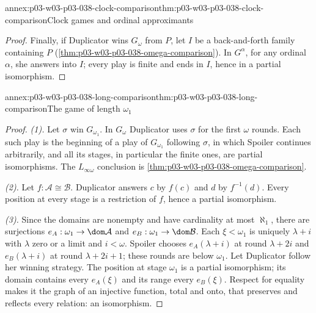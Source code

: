 \begin{annexitem}{annex:p03-w03-p03-038-clock-comparison}{thm:p03-w03-p03-038-clock-comparison}{Clock games and ordinal approximants}
\begin{proof}
Finally, if Duplicator wins \(G_\omega\) from \(P\), let \(I\) be a
back-and-forth family containing \(P\)
(\cref{thm:p03-w03-p03-038-omega-comparison}). In \(G^\alpha\), for any
ordinal \(\alpha\), she answers into \(I\); every play is finite and ends in
\(I\), hence in a partial isomorphism.
\end{proof}
\end{annexitem}

\begin{annexitem}{annex:p03-w03-p03-038-long-comparison}{thm:p03-w03-p03-038-long-comparison}{The game of length \(\omega_1\)}
\begin{proof}
\emph{(1).} Let \(\sigma\) win \(G_{\omega_1}\). In \(G_\omega\) Duplicator
uses \(\sigma\) for the first \(\omega\) rounds. Each such play is the
beginning of a play of \(G_{\omega_1}\) following \(\sigma\), in which Spoiler
continues arbitrarily, and all its stages, in particular the finite ones, are
partial isomorphisms. The \(L_{\infty\omega}\) conclusion is
\cref{thm:p03-w03-p03-038-omega-comparison}.

\emph{(2).} Let \(f:\mathcal A\cong\mathcal B\). Duplicator answers \(c\) by
\(f(c)\) and \(d\) by \(f^{-1}(d)\). Every position at every stage is a
restriction of \(f\), hence a partial isomorphism.

\emph{(3).} Since the domains are nonempty and have cardinality at most
\(\aleph_1\), there are surjections \(e_A:\omega_1\to\dom\mathcal A\) and
\(e_B:\omega_1\to\dom\mathcal B\). Each \(\xi<\omega_1\) is uniquely
\(\lambda+i\) with \(\lambda\) zero or a limit and \(i<\omega\). Spoiler
chooses \(e_A(\lambda+i)\) at round \(\lambda+2i\) and \(e_B(\lambda+i)\) at
round \(\lambda+2i+1\); these rounds are below \(\omega_1\). Let Duplicator
follow her winning strategy. The position at stage \(\omega_1\) is a partial
isomorphism; its domain contains every \(e_A(\xi)\) and its range every
\(e_B(\xi)\). Respect for equality makes it the graph of an injective
function, total and onto, that preserves and reflects every relation: an
isomorphism.
\end{proof}
\end{annexitem}

